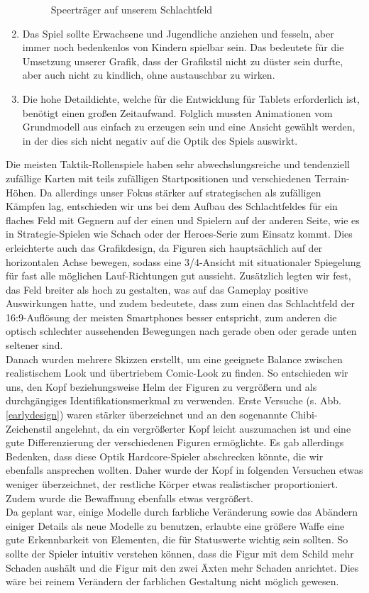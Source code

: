 \documentclass[extern,palatino]{cgBA}
\begin{document}
\begin{enumerate}
\begin{figure}[H]
		\caption{Speerträger auf unserem Schlachtfeld}
		\label{speerkarte}
\end{figure}
\item Das Spiel sollte Erwachsene und Jugendliche anziehen und fesseln, aber immer noch bedenkenlos von Kindern spielbar sein. Das bedeutete für die Umsetzung unserer Grafik, dass der Grafikstil nicht zu düster sein durfte, aber auch nicht zu kindlich, ohne austauschbar zu wirken.
\item Die hohe Detaildichte, welche für die Entwicklung für Tablets erforderlich ist, benötigt einen großen Zeitaufwand. Folglich mussten Animationen vom Grundmodell aus einfach zu erzeugen sein und eine Ansicht gewählt werden, in der dies sich nicht negativ auf die Optik des Spiels auswirkt.
\end{enumerate}
Die meisten Taktik-Rollenspiele haben sehr abwechslungsreiche und tendenziell zufällige Karten mit teils zufälligen Startpositionen und verschiedenen Terrain-Höhen. Da allerdings unser Fokus stärker auf strategischen als zufälligen Kämpfen lag, entschieden wir uns bei dem Aufbau des Schlachtfeldes für ein flaches Feld mit Gegnern auf der einen und Spielern auf der anderen Seite, wie es in Strategie-Spielen wie Schach oder der Heroes-Serie zum Einsatz kommt. Dies erleichterte auch das Grafikdesign, da Figuren sich hauptsächlich auf der horizontalen Achse bewegen, sodass eine 3/4-Ansicht mit situationaler Spiegelung für fast alle möglichen Lauf-Richtungen gut aussieht. Zusätzlich legten wir fest, das Feld breiter als hoch zu gestalten, was auf das Gameplay positive Auswirkungen hatte, und zudem bedeutete, dass zum einen das Schlachtfeld der 16:9-Auflösung der meisten Smartphones besser entspricht, zum anderen die optisch schlechter aussehenden Bewegungen nach gerade oben oder gerade unten seltener sind.
\\Danach wurden mehrere Skizzen erstellt, um eine geeignete Balance zwischen realistischem Look und übertriebem Comic-Look zu finden. So entschieden wir uns, den Kopf beziehungsweise Helm der Figuren zu vergrößern und als durchgängiges Identifikationsmerkmal zu verwenden. Erste Versuche (s. Abb. \ref{earlydesign}) waren stärker überzeichnet und an den sogenannte Chibi-Zeichenstil angelehnt, da ein vergrößerter Kopf leicht auszumachen ist und eine gute Differenzierung der verschiedenen Figuren ermöglichte. Es gab allerdings Bedenken, dass diese Optik Hardcore-Spieler abschrecken könnte, die wir ebenfalls ansprechen wollten. Daher wurde der Kopf in folgenden Versuchen etwas weniger überzeichnet, der restliche Körper etwas realistischer proportioniert. Zudem wurde die Bewaffnung ebenfalls etwas vergrößert. 
\\Da geplant war, einige Modelle durch farbliche Veränderung sowie das Abändern einiger Details als neue Modelle zu benutzen, erlaubte eine größere Waffe eine gute Erkennbarkeit von Elementen, die für Statuswerte wichtig sein sollten. So sollte der Spieler intuitiv verstehen können, dass die Figur mit dem Schild mehr Schaden aushält und die Figur mit den zwei Äxten mehr Schaden anrichtet. Dies wäre bei reinem Verändern der farblichen Gestaltung nicht möglich gewesen.
\end{document}
